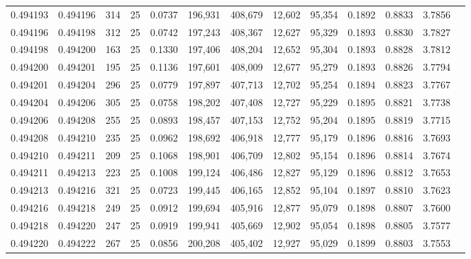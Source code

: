\begin{tabular}{rrrrrrrrrrrrr}
0.494193 & 0.494196 &   314 &  25 &                                     0.0737 & 196,931 & 408,679 &  12,602 &  95,354 & 0.1892 & 0.8833 & 3.7856 \\
0.494196 & 0.494198 &   312 &  25 &                                     0.0742 & 197,243 & 408,367 &  12,627 &  95,329 & 0.1893 & 0.8830 & 3.7827 \\
0.494198 & 0.494200 &   163 &  25 &                                     0.1330 & 197,406 & 408,204 &  12,652 &  95,304 & 0.1893 & 0.8828 & 3.7812 \\
0.494200 & 0.494201 &   195 &  25 &                                     0.1136 & 197,601 & 408,009 &  12,677 &  95,279 & 0.1893 & 0.8826 & 3.7794 \\
0.494201 & 0.494204 &   296 &  25 &                                     0.0779 & 197,897 & 407,713 &  12,702 &  95,254 & 0.1894 & 0.8823 & 3.7767 \\
0.494204 & 0.494206 &   305 &  25 &                                     0.0758 & 198,202 & 407,408 &  12,727 &  95,229 & 0.1895 & 0.8821 & 3.7738 \\
0.494206 & 0.494208 &   255 &  25 &                                     0.0893 & 198,457 & 407,153 &  12,752 &  95,204 & 0.1895 & 0.8819 & 3.7715 \\
0.494208 & 0.494210 &   235 &  25 &                                     0.0962 & 198,692 & 406,918 &  12,777 &  95,179 & 0.1896 & 0.8816 & 3.7693 \\
0.494210 & 0.494211 &   209 &  25 &                                     0.1068 & 198,901 & 406,709 &  12,802 &  95,154 & 0.1896 & 0.8814 & 3.7674 \\
0.494211 & 0.494213 &   223 &  25 &                                     0.1008 & 199,124 & 406,486 &  12,827 &  95,129 & 0.1896 & 0.8812 & 3.7653 \\
0.494213 & 0.494216 &   321 &  25 &                                     0.0723 & 199,445 & 406,165 &  12,852 &  95,104 & 0.1897 & 0.8810 & 3.7623 \\
0.494216 & 0.494218 &   249 &  25 &                                     0.0912 & 199,694 & 405,916 &  12,877 &  95,079 & 0.1898 & 0.8807 & 3.7600 \\
0.494218 & 0.494220 &   247 &  25 &                                     0.0919 & 199,941 & 405,669 &  12,902 &  95,054 & 0.1898 & 0.8805 & 3.7577 \\
0.494220 & 0.494222 &   267 &  25 &                                     0.0856 & 200,208 & 405,402 &  12,927 &  95,029 & 0.1899 & 0.8803 & 3.7553 \\

\end{tabular}

